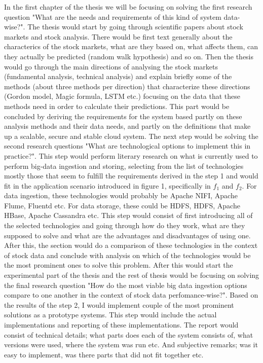 In the first chapter of the thesis we will be focusing on solving the first research question "What are the needs and requirements of this kind of system data-wise?".
The thesis would start by going through scientific papers about stock markets and stock analysis.
There would be first text generally about the characterics of the stock markets, what are they based on, what affects them, can they actually be predicted (random walk hypothesis) and so on.
Then the thesis would go through the main directions of analysing the stock markets (fundamental analysis, technical analysis) and explain briefly some of the methods (about three methods per direction) that characterize these directions (Gordon model, Magic formula, LSTM etc.) focusing on the data that these methods need in order to calculate their predictions.
This part would be concluded by deriving the requirements for the system based partly on these analysis methods and their data needs, and partly on the definitions that make up a scalable, secure and stable cloud system.
The next step would be solving the second research questions "What are technological options to implement this in practice?".
This step would perform literary research on what is currently used to perform big-data ingestion and storing, selecting from the list of technologies mostly those that seem to fulfill the requirements derived in the step 1 and would fit in the application scenario introduced in figure 1, specifically in $f_1$ and $f_2$.
For data ingestion, these technologies would probably be Apache NIFI, Apache Flume, Fluentd etc. 
For data storage, these could be HDFS, HDFS, Apache HBase, Apache Cassandra etc.
This step would consist of first introducing all of the selected technologies and going through how do they work, what are they supposed to solve and what are the advantages and disadvantages of using one.
After this, the section would do a comparison of these technologies in the context of stock data and conclude with analysis on which of the technologies would be the most prominent ones to solve this problem.
After this would start the experimental part of the thesis and the rest of thesis would be focusing on solving the final research question "How do the most viable big data ingestion options compare to one another in the context of stock data perfomance-wise?".
Based on the results of the step 2, I would implement couple of the most prominent solutions as a prototype systems.
This step would include the actual implementations and reporting of these implementations.
The report would consist of technical details; what parts does each of the system consists of, what versions were used, where the system was run etc. And subjective remarks; was it easy to implement, was there parts that did not fit together etc. 
